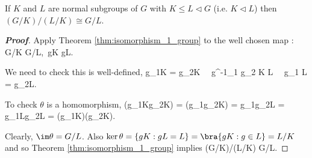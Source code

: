 
\begin{theorem}\label{thm:isomorphism_3_group}
If $K$ and $L$ are normal subgroups of $G$ with $K \leq L \lhd G$ (i.e. $K\lhd L$) then $(G/K)/(L/K) \cong G/L$.
\end{theorem}

\begin{proof}[\bf Proof]
Apply Theorem \ref{thm:isomorphism_1_group} to the well chosen map
\be
\theta : G/K \to G/L,\ gK \mapsto gL.
\ee

We need to check this is well-defined,
\be
g_1K = g_2K \ \ra \ g^{-1}_1 g_2 \in K \leq L \ \ra \ g_1 L = g_2L.
\ee

To check $\theta$ is a homomorphism,
\be
\theta(g_1Kg_2K) = \theta(g_1g_2K) = g_1g_2L = g_1Lg_2L = \theta(g_1K)\theta(g_2K).
\ee

Clearly, $\im \theta = G/L$. Also $\ker \theta = \{gK : gL = L\} = \bra{gK : g \in L} = L/K$ and so Theorem \ref{thm:isomorphism_1_group} implies
\be
(G/K)/(L/K) \cong G/L.
\ee
\end{proof}





